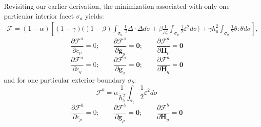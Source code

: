 \documentclass[11pt]{article} %
\begin{document}
Revisiting our earlier derivation, the minimization associated with only one particular interior facet $\sigma_a$ yields:
\begin{eqnarray}
	\mathcal{F} = (1-\alpha) \left[ (1 - \gamma) \bigg( (1-\beta) \int_{\sigma_a} \frac{1}{2} \Delta \cdot \Delta d \sigma + \beta \frac{1}{h_a^2} \int_{\sigma_a} \frac{1}{2} \varepsilon^2 d \sigma \bigg) + \gamma h_a^2 \int_{\sigma_a} \frac{1}{2} \theta \colon \theta d \sigma \right] ,
\end{eqnarray}
\begin{equation}
	\frac{\partial \mathcal{F}^a}{\partial c_p} = 0; \qquad \frac{\partial \mathcal{F}^a}{\partial \mathbf{g}_p} = \mathbf{0}; \qquad \frac{\partial \mathcal{F}^a}{\partial \mathbf{H}_{p}} = \mathbf{0}
\end{equation}
\begin{equation}
	\frac{\partial \mathcal{F}^a}{\partial c_q} = 0; \qquad \frac{\partial \mathcal{F}^a}{\partial \mathbf{g}_q} = \mathbf{0}; \qquad \frac{\partial \mathcal{F}^a}{\partial \mathbf{H}_{q}} = \mathbf{0}
\end{equation}
and for one particular exterior boundary $\sigma_b$:
\begin{equation}
	\mathcal{F}^b = \alpha \frac{1}{h_b^2} \int_{\sigma_b} \frac{1}{2} \varepsilon^2 d \sigma
\end{equation}
\begin{equation}
	\frac{\partial \mathcal{F}^b}{\partial c_p} = 0; \qquad \frac{\partial \mathcal{F}^b}{\partial \mathbf{g}_p} = \mathbf{0}; \qquad \frac{\partial \mathcal{F}^b}{\partial \mathbf{H}_{p}} = \mathbf{0}
\end{equation}
\end{document}
